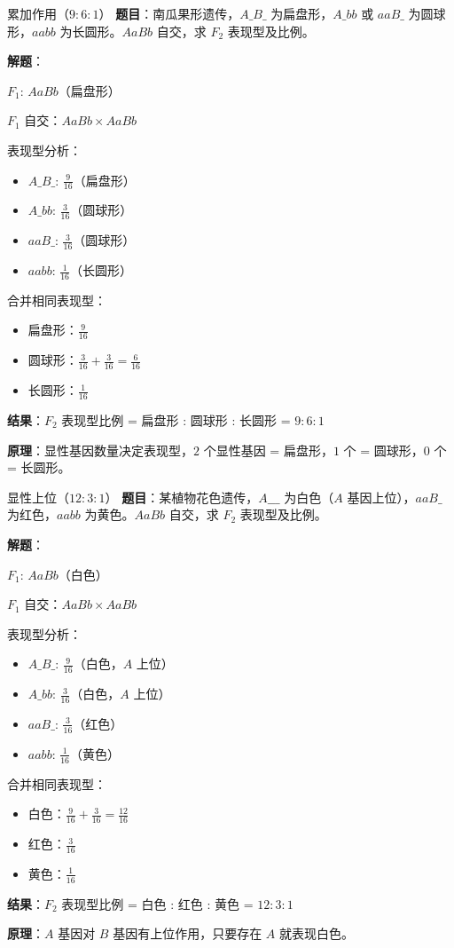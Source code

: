 \documentclass[a4paper,11pt]{ctexart}
\begin{document}
\begin{examplebox}{累加作用（$9:6:1$）}
\textbf{题目}：南瓜果形遗传，$A\_B\_$ 为扁盘形，$A\_bb$ 或 $aaB\_$ 为圆球形，$aabb$ 为长圆形。$AaBb$ 自交，求 $F_2$ 表现型及比例。

\textbf{解题}：

$F_1$: $AaBb$（扁盘形）

$F_1$ 自交：$AaBb \times AaBb$

表现型分析：
\begin{itemize}[leftmargin=2em]
    \item $A\_B\_$: $\frac{9}{16}$（扁盘形）
    \item $A\_bb$: $\frac{3}{16}$（圆球形）
    \item $aaB\_$: $\frac{3}{16}$（圆球形）
    \item $aabb$: $\frac{1}{16}$（长圆形）
\end{itemize}

合并相同表现型：
\begin{itemize}[leftmargin=2em]
    \item 扁盘形：$\frac{9}{16}$
    \item 圆球形：$\frac{3}{16} + \frac{3}{16} = \frac{6}{16}$
    \item 长圆形：$\frac{1}{16}$
\end{itemize}

\textbf{结果}：$F_2$ 表现型比例 = 扁盘形 : 圆球形 : 长圆形 = $9:6:1$

\textbf{原理}：显性基因数量决定表现型，$2$ 个显性基因 = 扁盘形，$1$ 个 = 圆球形，$0$ 个 = 长圆形。
\end{examplebox}

\begin{examplebox}{显性上位（$12:3:1$）}
\textbf{题目}：某植物花色遗传，$A\_\_\_$ 为白色（$A$ 基因上位），$aaB\_$ 为红色，$aabb$ 为黄色。$AaBb$ 自交，求 $F_2$ 表现型及比例。

\textbf{解题}：

$F_1$: $AaBb$（白色）

$F_1$ 自交：$AaBb \times AaBb$

表现型分析：
\begin{itemize}[leftmargin=2em]
    \item $A\_B\_$: $\frac{9}{16}$（白色，$A$ 上位）
    \item $A\_bb$: $\frac{3}{16}$（白色，$A$ 上位）
    \item $aaB\_$: $\frac{3}{16}$（红色）
    \item $aabb$: $\frac{1}{16}$（黄色）
\end{itemize}

合并相同表现型：
\begin{itemize}[leftmargin=2em]
    \item 白色：$\frac{9}{16} + \frac{3}{16} = \frac{12}{16}$
    \item 红色：$\frac{3}{16}$
    \item 黄色：$\frac{1}{16}$
\end{itemize}

\textbf{结果}：$F_2$ 表现型比例 = 白色 : 红色 : 黄色 = $12:3:1$

\textbf{原理}：$A$ 基因对 $B$ 基因有上位作用，只要存在 $A$ 就表现白色。
\end{examplebox}
\end{document}
